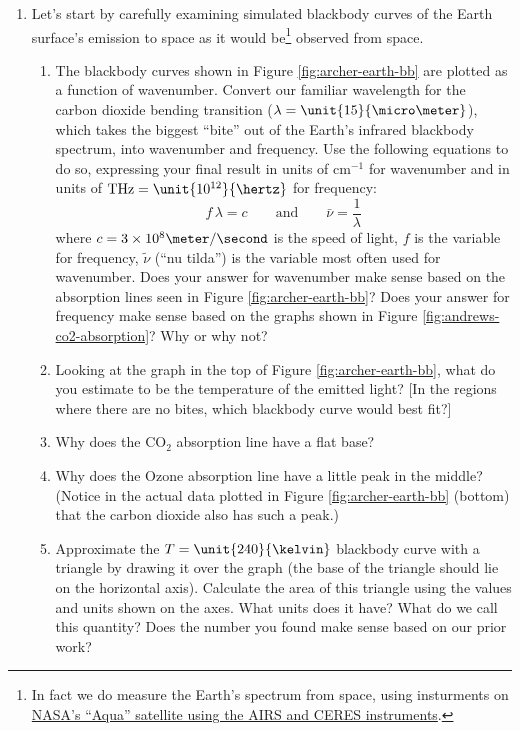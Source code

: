 \documentclass[12pt]{article}
\begin{document}
\begin{enumerate}

\item  Let's start by carefully examining simulated blackbody curves of the Earth surface's emission to space as it would be\footnote{In fact we do measure the Earth's spectrum from space, using insturments on \href{https://en.wikipedia.org/wiki/Atmospheric_infrared_sounder}{NASA's  ``Aqua''  satellite using the AIRS and CERES instruments}.} observed from space.
	\begin{enumerate}
	\item The blackbody curves shown in Figure \ref{fig:archer-earth-bb} are plotted as a function of wavenumber.  Convert our familiar wavelength for the carbon dioxide bending transition ($\lambda = \unit{15}{\micro\meter}$), which takes the biggest ``bite'' out of the Earth's infrared blackbody spectrum, into wavenumber and frequency.  Use the following equations to do so, expressing your final result in units of $\text{cm}^{-1}$ for wavenumber and in units of $\text{THz} = \unit{10^{12}}{\hertz}$ for frequency:
		\begin{equation*}
		f \, \lambda = c \quad \quad \text{and} \quad \quad  \bar{\nu} = \frac{1}{\lambda}
		\end{equation*}
	where $c = {3\times10^8}{\meter/\second}$ is the speed of light, $f$ is the variable for frequency, $\tilde{\nu}$ (``nu tilda'') is the variable most often used for wavenumber. Does your answer for wavenumber make sense based on the absorption lines seen in Figure \ref{fig:archer-earth-bb}?  Does your answer for frequency make sense based on the graphs shown in Figure \ref{fig:andrews-co2-absorption}? Why or why not?
	\item Looking at the graph in the top of Figure \ref{fig:archer-earth-bb}, what do you estimate to be the temperature of the emitted light?  [In the regions where there are no bites, which blackbody curve would best fit?]
	\item Why does the $\text{CO}_2$ absorption line have a flat base?  
	\item Why does the Ozone absorption line have a little peak in the middle? (Notice in the actual data plotted in Figure \ref{fig:archer-earth-bb} (bottom) that the carbon dioxide also has such a peak.)
	\item Approximate the $T=\unit{240}{\kelvin}$ blackbody curve with a triangle by drawing it over the graph (the base of the triangle should lie on the horizontal axis).  Calculate the area of this triangle using the values and units shown on the axes.  What units does it have? What do we call this quantity? Does the number you found make sense based on our prior work?
	\end{enumerate}
	

\end{enumerate}
\end{document}
